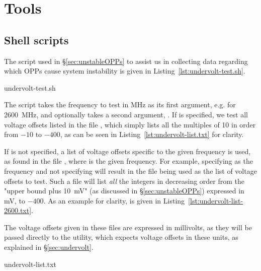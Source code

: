 \section{Tools}
\label{sec:tools}

\subsection{Shell scripts}
\label{sec:undervolt-test.sh}

The script used in §\ref{sec:unstableOPPs} to assist us in collecting data
regarding which OPPs cause system instability is given in
Listing~\ref{lst:undervolt-test.sh}.


    {undervolt-test.sh}

The script takes the frequency to test in MHz as its first argument, e.g.
 for 2600~MHz, and optionally takes a second argument, .
If  is specified, we test all voltage offsets listed in the file
, which simply lists all the multiples of 10 in order
from $-10$ to $-400$, as can be seen in Listing~\ref{lst:undervolt-list.txt}
for clarity.

If  is not specified, a list of voltage offsets specific
to the given frequency is used, as found in the file
, where  is the given
frequency. For example, specifying  as the frequency and not
specifying  will result in the file 
being used as the list of voltage offsets to test. Such a file will list
\emph{all} the integers in decreasing order from the "upper bound plus 10~mV"
(as discussed in §\ref{sec:unstableOPPs}) expressed in mV, to $-400$. As an
example for clarity,  is given in
Listing~\ref{lst:undervolt-list-2600.txt}.

The voltage offsets given in these files are expressed in millivolts, as they
will be passed directly to the  utility, which expects voltage
offsets in these units, as explained in §\ref{sec:undervolt}.


    {undervolt-list.txt}

